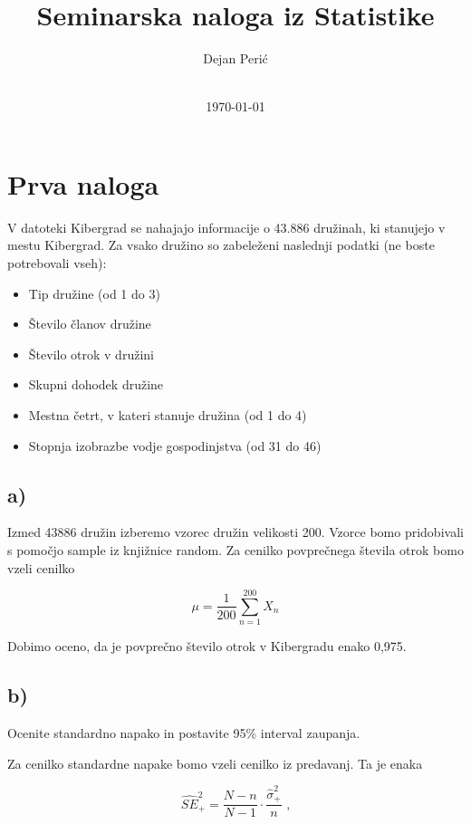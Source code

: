 \documentclass[12pt, a4paper]{article}
\title{Seminarska naloga iz Statistike}
\author{Dejan Perić \\~ \\ }
\date{\today}
\begin{document}

\maketitle




\section{Prva naloga}

V datoteki Kibergrad se nahajajo informacije o 43.886 družinah, 
ki stanujejo v mestu Kibergrad. Za vsako družino so zabeleženi 
naslednji podatki (ne boste potrebovali vseh):

\begin{itemize}
    \item Tip družine (od 1 do 3)
    \item Število članov družine
    \item Število otrok v družini
    \item Skupni dohodek družine
    \item Mestna četrt, v kateri stanuje družina (od 1 do 4)
    \item Stopnja izobrazbe vodje gospodinjstva (od 31 do 46)
\end{itemize}
    
\subsection{a)}

Izmed 43886 družin izberemo vzorec družin velikosti 200. Vzorce bomo pridobivali s pomočjo sample iz knjižnice random. Za cenilko povprečnega števila otrok bomo vzeli cenilko

$$\mu = \frac{1}{200}\sum^{200}_{n=1} X_n $$

Dobimo oceno, da je povprečno število otrok v Kibergradu enako 0,975.

\subsection{b)}
Ocenite standardno napako in postavite 95\% interval zaupanja.

Za cenilko standardne napake bomo vzeli cenilko iz predavanj. Ta je enaka 

$$ \hat{SE}_+^2 = \frac{N-n}{N-1} \cdot \frac{\hat{\sigma}_+^2}{n} \text{ ,}$$
\end{document}
